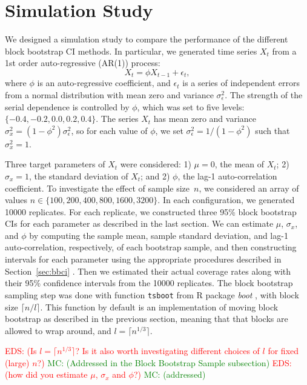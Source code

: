 \documentclass[12pt, letterpaper, titlepage]{article}
\newcommand{\eds}[1]{\textcolor{red}{EDS: (#1)}}
\newcommand{\mc}[1]{\textcolor{green}{MC: (#1)}}
\begin{document}
\section{Simulation Study}
\label{sec:simu}

We designed a simulation study to compare the performance of the different
block
bootstrap CI methods. In particular, we generated time series $X_t$
from a 1st order auto-regressive (AR(1)) process:
\[
X_t = \phi X_{t-1} + \epsilon_t,
\]
where $\phi$ is an auto-regressive coefficient, and $\epsilon_t$ is a series of
independent errors from a normal distribution with mean zero and variance
$\sigma_{\epsilon}^2$. The strength of the serial dependence is controlled by
$\phi$, which was set to five levels: $\{-0.4, -0.2, 0.0, 0.2, 0.4\}$.
The series $X_t$ has mean zero and variance
$\sigma_x^2 = (1 - \phi^2) \sigma_{\epsilon}^2$, so for each value of $\phi$,
we
set $\sigma_{\epsilon}^2 = 1 / (1 - \phi^2)$ such that $\sigma_x^2 = 1$.


Three target parameters of $X_t$ were considered:
1) $\mu = 0$, the mean of $X_t$;
2) $\sigma_x = 1$, the standard deviation of $X_t$; and
2) $\phi$, the lag-1 auto-correlation coefficient.
To investigate the effect of sample size~$n$, we considered an array of values
$n \in \{100, 200, 400, 800, 1600, 3200\}$. In each configuration, we generated 10000
replicates. For each replicate, we constructed three 95\% block bootstrap
CIs for each parameter as described in the last section. We can estimate 
$\mu$, $\sigma_x$, and $\phi$ by computing the sample mean, sample 
standard deviation,
and lag-1 auto-correlation, respectively, of each bootstrap sample, and then 
constructing intervals for each parameter using the appropriate procedures
described in Section~\ref{sec:bbci} .
Then we estimated their actual coverage rates along with their 95\% confidence
intervals from the 10000 replicates. The block bootstrap sampling step was done
with function \texttt{tsboot} from R package \textsl{boot} \citep{boot}, with
block size $\lceil n / l \rceil$. This function by default is an implementation
of moving block bootstrap as described in the previous section, meaning that
that blocks are allowed to wrap around, and $l = \lceil n^{1/3} \rceil$.

\eds{Is $l = \lceil n^{1/3} \rceil$? Is it also worth investigating different 
choices of $l$ for fixed (large) $n$?}
\mc{Addressed in the Block Bootstrap Sample subsection}
\eds{how did you estimate $\mu$, $\sigma_x$ and $\phi$?}
\mc{addressed}
\end{document}
